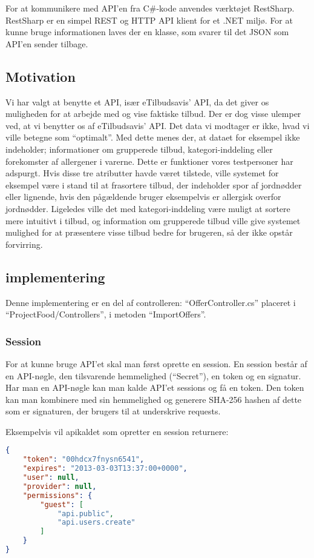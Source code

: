 For at kommunikere med API'en fra C\#-kode anvendes værktøjet RestSharp. RestSharp er en simpel REST og HTTP API klient for et .NET miljø. \citep{RestSharp}
For at kunne bruge informationen laves der en klasse, som svarer til det JSON som API'en sender tilbage.

\subsection{Motivation}\label{api:skoddata}
Vi har valgt at benytte et API, især eTilbudsavis' API, da det giver os muligheden for at arbejde med og vise faktiske tilbud.
Der er dog visse ulemper ved, at vi benytter os af eTilbudsavis' API. 
Det data vi modtager er ikke, hvad vi ville betegne som ``optimalt''. 
Med dette menes der, at dataet for eksempel ikke indeholder; informationer om grupperede tilbud, kategori-inddeling eller forekomster af allergener i varerne. 
Dette er funktioner vores testpersoner har adspurgt. 
Hvis disse tre atributter havde været tilstede, ville systemet for eksempel være i stand til at frasortere tilbud, der indeholder spor af jordnødder eller lignende, hvis den pågældende bruger eksempelvis er allergisk overfor jordnødder. 
Ligeledes ville det med kategori-inddeling være muligt at sortere mere intuitivt i tilbud, og information om grupperede tilbud ville give systemet mulighed for at præsentere visse tilbud bedre for brugeren, så der ikke opstår forvirring.

\subsection{implementering}
Denne implementering er en del af controlleren: ``OfferController.cs'' placeret i ``ProjectFood/Controllers'', i metoden ``ImportOffers''.
\subsubsection{Session}
For at kunne bruge API'et skal man først oprette en session.
En session består af en API-nøgle, den tilsvarende hemmelighed (``Secret''), en token og en signatur.
Har man en API-nøgle kan man kalde API'et sessions og få en token.
Den token kan man kombinere med sin hemmelighed og generere SHA-256 hashen af dette som er signaturen, der brugers til at underskrive requests.

Eksempelvis vil apikaldet som opretter en session returnere:
\begin{lstlisting}[language=json,firstnumber=1,caption="POST til sessions api'en med APIKEYen",label=apilst1]
{
    "token": "00hdcx7fnysn6541",
    "expires": "2013-03-03T13:37:00+0000",
    "user": null,
    "provider": null,
    "permissions": {
        "guest": [
            "api.public",
            "api.users.create"
        ]
    }
}
\end{lstlisting}

